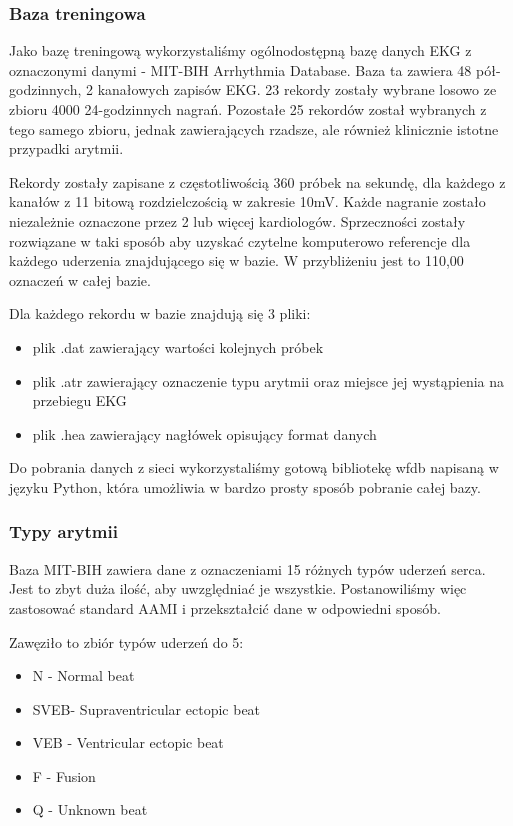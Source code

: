 \documentclass[polish,12pt]{aghthesis}
\begin{document}
\subsubsection{Baza treningowa}

Jako bazę treningową wykorzystaliśmy ogólnodostępną bazę danych EKG z oznaczonymi danymi - MIT-BIH Arrhythmia Database. Baza ta zawiera 48 pół-godzinnych, 2 kanałowych zapisów EKG. 23 rekordy zostały wybrane losowo ze zbioru 4000 24-godzinnych nagrań. Pozostałe 25 rekordów został wybranych z tego samego zbioru, jednak zawierających rzadsze, ale również klinicznie istotne przypadki arytmii.

Rekordy zostały zapisane z częstotliwością 360 próbek na sekundę, dla każdego z kanałów z 11 bitową rozdzielczością w zakresie 10mV. Każde nagranie zostało niezależnie oznaczone przez 2 lub więcej kardiologów. Sprzeczności zostały rozwiązane w taki sposób aby uzyskać czytelne komputerowo referencje dla każdego uderzenia znajdującego się w bazie. W przybliżeniu jest to 110,00 oznaczeń w całej bazie.

Dla każdego rekordu w bazie znajdują się 3 pliki:

\begin{itemize}
	\item plik .dat zawierający wartości kolejnych próbek
	\item plik .atr zawierający oznaczenie typu arytmii oraz miejsce jej wystąpienia na przebiegu EKG
	\item plik .hea zawierający nagłówek opisujący format danych
\end{itemize}

Do pobrania danych z sieci wykorzystaliśmy gotową bibliotekę wfdb napisaną w języku Python, która umożliwia w bardzo prosty sposób pobranie całej bazy.

\subsubsection{Typy arytmii}

Baza MIT-BIH zawiera dane z oznaczeniami 15 różnych typów uderzeń serca. Jest to zbyt duża ilość, aby uwzględniać je wszystkie. Postanowiliśmy więc zastosować standard AAMI i przekształcić dane w odpowiedni sposób.

Zawęziło to zbiór typów uderzeń do 5:

\begin{itemize}
	\item N - Normal beat
	\item SVEB- Supraventricular ectopic beat
	\item VEB - Ventricular ectopic beat
	\item F - Fusion
	\item Q - Unknown beat
\end{itemize}
\end{document}
